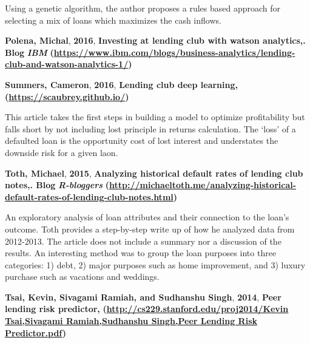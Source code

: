 \documentclass[conference,final,]{IEEEtran}
\begin{document}
Using a genetic algorithm, the author proposes a rules based approach
for selecting a mix of loans which maximizes the cash inflows.

\textbf{Polena, Michal}, \textbf{2016}, \textbf{Investing at lending
club with watson analytics,}\textbf{. Blog} \textbf{\emph{IBM}}\textbf{
(\url{https://www.ibm.com/blogs/business-analytics/lending-club-and-watson-analytics-1/})}

\textbf{Summers, Cameron}, \textbf{2016}, \textbf{Lending club deep
learning, }\textbf{ (\url{https://scaubrey.github.io/})}

This article takes the first steps in building a model to optimize
profitability but falls short by not including lost principle in returns
calculation. The `loss' of a defaulted loan is the opportunity cost of
lost interest and understates the downside risk for a given laon.

\textbf{Toth, Michael}, \textbf{2015}, \textbf{Analyzing historical
default rates of lending club notes,}\textbf{. Blog}
\textbf{\emph{R-bloggers}}\textbf{
(\url{http://michaeltoth.me/analyzing-historical-default-rates-of-lending-club-notes.html})}

An exploratory analysis of loan attributes and their connection to the
loan's outcome. Toth provides a step-by-step write up of how he analyzed
data from 2012-2013. The article does not include a summary nor a
discussion of the results. An interesting method was to group the loan
purposes into three categories: 1) debt, 2) major purposes such as home
improvement, and 3) luxury purchase such as vacations and weddings.

\textbf{Tsai, Kevin, Sivagami Ramiah, and Sudhanshu Singh},
\textbf{2014}, \textbf{Peer lending risk predictor, }\textbf{
(\href{http://cs229.stanford.edu/proj2014/Kevin\%20Tsai,Sivagami\%20Ramiah,Sudhanshu\%20Singh,Peer\%20Lending\%20Risk\%20Predictor.pdf}{http://cs229.stanford.edu/proj2014/Kevin Tsai,Sivagami Ramiah,Sudhanshu Singh,Peer Lending Risk Predictor.pdf})}
\end{document}
